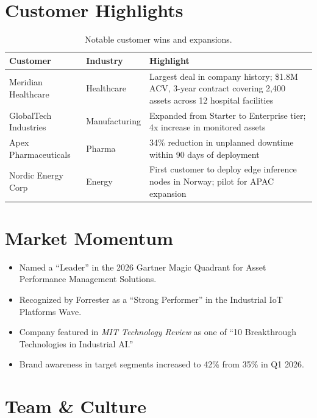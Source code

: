 \documentclass[
    language=english,
    doctype=stakeholder-report,
    institution=none,
]{../../omnilatex}
\begin{document}
\section{Customer Highlights}

\begin{table}[h]
    \centering
    \begin{tabular}{lll}
        \toprule
        \textbf{Customer} & \textbf{Industry} & \textbf{Highlight} \\
        \midrule
        Meridian Healthcare   & Healthcare    & Largest deal in company history;
            \$1.8M ACV, 3-year contract covering 2,400 assets across
            12 hospital facilities \\
        GlobalTech Industries & Manufacturing & Expanded from Starter to Enterprise
            tier; 4x increase in monitored assets \\
        Apex Pharmaceuticals  & Pharma        & 34\% reduction in unplanned downtime
            within 90 days of deployment \\
        Nordic Energy Corp    & Energy        & First customer to deploy edge
            inference nodes in Norway; pilot for APAC expansion \\
        \bottomrule
    \end{tabular}
    \caption{Notable customer wins and expansions.}
\end{table}

\section{Market Momentum}

\begin{itemize}
    \item Named a ``Leader'' in the 2026 Gartner Magic Quadrant for
        Asset Performance Management Solutions.
    \item Recognized by Forrester as a ``Strong Performer'' in the
        Industrial IoT Platforms Wave.
    \item Company featured in \textit{MIT Technology Review} as one of
        ``10 Breakthrough Technologies in Industrial AI.''
    \item Brand awareness in target segments increased to 42\% from 35\%
        in Q1 2026.
\end{itemize}

\section{Team \& Culture}
\end{document}
